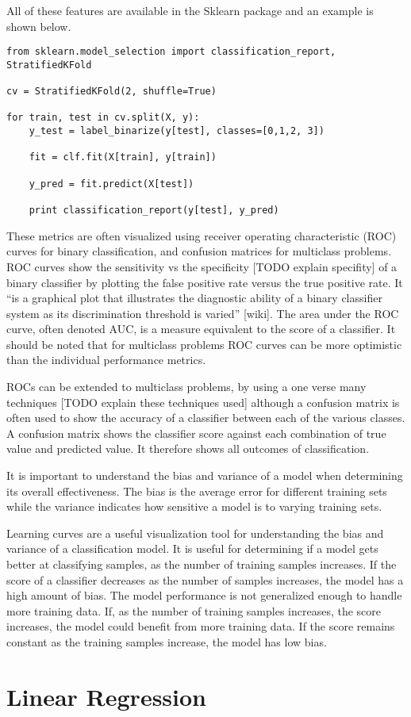 All of these features are available in the Sklearn package and an example is shown below.
%
\begin{lstlisting}
from sklearn.model_selection import classification_report, StratifiedKFold

cv = StratifiedKFold(2, shuffle=True)

for train, test in cv.split(X, y):
    y_test = label_binarize(y[test], classes=[0,1,2, 3])

    fit = clf.fit(X[train], y[train])

    y_pred = fit.predict(X[test])

    print classification_report(y[test], y_pred)
\end{lstlisting}
%
These metrics are often visualized using receiver operating characteristic (ROC) curves for binary classification, and confusion matrices for multiclass problems.  ROC curves show the sensitivity vs the specificity [TODO explain specifity] of a binary classifier by plotting the false positive rate versus the true positive rate.  It “is a graphical plot that illustrates the diagnostic ability of a binary classifier system as its discrimination threshold is varied” [wiki]. The area under the ROC curve, often denoted AUC, is a measure equivalent to the score of a classifier. It should be noted that for multiclass problems ROC curves can be more optimistic than the individual performance metrics.

ROCs can be extended to multiclass problems, by using a one verse many techniques [TODO explain these techniques used] although a confusion matrix is often used to show the accuracy of a classifier between each of the various classes.  A confusion matrix shows the classifier score against each combination of true value and predicted value.  It therefore shows all outcomes of classification.

It is important to understand the bias and variance of a model when determining its overall effectiveness.  The bias is the average error for different training sets while the variance indicates how sensitive a model is to varying training sets.

Learning curves are a useful visualization tool for understanding the bias and variance of a classification model.  It is useful for determining if a model gets better at classifying samples, as the number of training samples increases.  If the score of a classifier decreases as the number of samples increases, the model has a high amount of bias.  The model performance is not generalized enough to handle more training data.  If, as the number of training samples increases, the score increases, the model could benefit from more training data.  If the score remains constant as the training samples increase, the model has low bias.

\section{Linear Regression}
